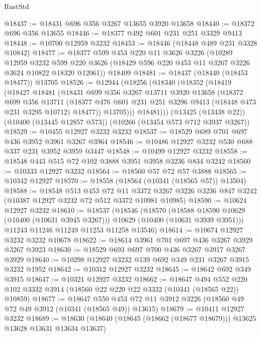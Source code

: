 \begin{lexlean}{RustStd}
\begin{coremodule}
{\begin{coremodule}
{{{{{{{{{{{{{{{{{{{{{{{{{@18437 := @18431 @696 @356 @3267 @13655 @3920 @13658
@18440 := @18372 @696 @356 @13655
@18446 := @18377 @492 @601 @231 @251 @3329 @9413
@18448 := @10700 @12959 @3232
@18453 := @18446 (@18448 @489 @231 @3328 @10842)
@18477 := @18377
    @599
    @453
    @220
    @11
    @3626
    @3226
    (@10289
      @12959
      @3232
      @599
      @220
      @3626
      (@18429 @596 @220 @453 @11 @3267 @3226 @3624 @10822 @18320 @12061))
    @18409
@18481 := @18437 (@18440 (@18453 @18477)) @13705
@18526 := @12944
    (@18256
      (@18340
        (@18352
          (@18419
            (@18427
              @18481
              (@18431
                @699
                @356
                @3267
                @13711
                @3920
                @13658
                (@18372
                  @699
                  @356
                  @13711
                  (@18377 @476 @601 @231 @251 @3296 @9413 (@18448 @473 @231 @3295 @10712) @18477))
                @13705)))
          @18481)))
    (@13425 (@13438 @22))
    (@10400 (@13445 @12857 @573))
    (@10266 (@13454 @573 @712 @3937 @3267))
@18529 := @10455 @12927 @3232 @3232
@18537 := @18529 @689 @701 @697 @436 @3952 @3961 @3267 @3964
@18546 := @10486 @12927 @3232 @530 @688 @337 @231 @3952 @3959 @3447
@18548 := @10499 @12927 @3232
@18558 := @18548 @443 @515 @72 @102 @3888 @3951 @3958 @3236 @834 @3242
@18560 := @10333 @12927 @3232
@18564 := @18560 @57 @72 @57 @3888
@18565 := @10342 @12927
@18570 := @18558 (@18564 (@10341 (@18565 @57)) @13504)
@18588 := @18548
    @513
    @453
    @72
    @11
    @3372
    @3267
    @3226
    @3236
    @847
    @3242
    (@10387 @12927 @3232 @72 @512 @3372 @10981 @10985)
@18590 := @10624 @12927 @3232
@18610 := @18537
    (@18546
      (@18570
        (@18588 @18590 @10629 (@10400 (@10631 @3945 @3267)))
        @10629
        (@10400 (@10631 @3939 @3951)))
      @11243
      @11246
      @11249
      @11253
      @11258
      @13546)
@18614 := @10674 @12927 @3232 @3232 @10678
@18622 := @18614 @3961 @701 @697 @436 @3267 @3929 @3267 @3923
@18630 := @18529 @693 @697 @700 @436 @3267 @3917 @3267 @3929
@18640 := @10298 @12927 @3232 @139 @692 @349 @231 @3267 @3915 @3232 @1952
@18642 := @10312 @12927 @3232
@18645 := @18642 @692 @349 @3915
@18647 := @10321 @12927 @3232
@18662 := @18647
    @494
    @552
    @220
    @102
    @3332
    @3914
    (@18560 @22 @220 @22 @3332 (@10341 (@18565 @22)) @10859)
@18677 := @18647
    @550
    @453
    @72
    @11
    @3912
    @3226
    (@18560 @49 @72 @49 @3912 (@10341 (@18565 @49)) @13615)
@18679 := @10411 @12927 @3232
@18689 := @18630 (@18640 (@18645 (@18662 (@18677 @18679))) @13625 @13628 @13631 @13634 @13637)
}}}}}}}}}}}}}}}}}}}}}}}}}
\end{coremodule}}
\end{coremodule}
\end{lexlean}

